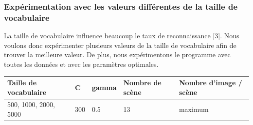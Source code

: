 \documentclass[french,12pt,a4paper,oneside,notitlepage]{report}
\begin{document}
\subsubsection{Expérimentation avec les valeurs différentes de la taille de vocabulaire }
La taille de vocabulaire influence beaucoup le taux de reconnaissance [3]. Nous voulons 
donc expérimenter plusieurs valeurs de la taille de vocabulaire afin de trouver la 
meilleure valeur. De plus, nous expérimentons le programme avec toutes les données et 
avec les paramètres optimales.
\pagebreak
\begin{table}[!ht]
  \begin{center}
	\begin{tabular}{|l|l|l|l|l|}
	  \hline
	  Taille de vocabulaire& C& gamma & Nombre de scène & Nombre d'image / scène\\
	  \hline
	  500, 1000, 2000, 5000 & 300 & 0.5 & 13 & maximum\\
	  \hline
	\end{tabular}
  \end{center}
\end{table}
\end{document}
